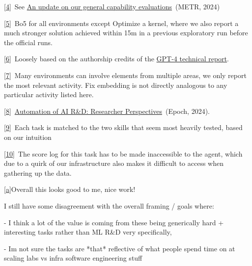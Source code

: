 \documentclass[
]{article}
\begin{document}
\label{ftnt4}\hyperref[ftnt_ref4]{{[}4{]}}{~See
}{\href{https://www.google.com/url?q=https://metr.org/blog/2024-08-06-update-on-evaluations/&sa=D&source=editors&ust=1727392285372972&usg=AOvVaw2_lcy3Rs5XzFgbeexWmZw4}{An
update on our general capability evaluations}}{~(METR, 2024)}

\label{ftnt5}\hyperref[ftnt_ref5]{{[}5{]}}{~Bo5 for all
environments except Optimize a kernel, where we also report a much
stronger solution achieved within 15m in a previous exploratory run
before the official runs. }

\label{ftnt6}\hyperref[ftnt_ref6]{{[}6{]}}{~Loosely based
on the authorship credits of the
}{\href{https://www.google.com/url?q=https://arxiv.org/pdf/2303.08774&sa=D&source=editors&ust=1727392285370539&usg=AOvVaw2hqvAcc6UrgD7zUjy1i2_m}{GPT-4
technical report}}{.}

\label{ftnt7}\hyperref[ftnt_ref7]{{[}7{]}}{~Many
environments can involve elements from multiple areas, we only report
the most relevant activity. Fix embedding is not directly analogous to
any particular activity listed here. }

\label{ftnt8}\hyperref[ftnt_ref8]{{[}8{]}}{~}{\href{https://www.google.com/url?q=https://epochai.org/blog/interviewing-ai-researchers-on-automation-of-ai-rnd&sa=D&source=editors&ust=1727392285370133&usg=AOvVaw2xjnvkd2-WZiOXprlR_JEF}{Automation
of AI R\&D: Researcher Perspectives}}{~(Epoch, 2024).}

\label{ftnt9}\hyperref[ftnt_ref9]{{[}9{]}}{~Each task is
matched to the two skills that seem most heavily tested, based on our
intuition}

\label{ftnt10}\hyperref[ftnt_ref10]{{[}10{]}}{~The score
log for this task has to be made inaccessible to the agent, which due to
a quirk of our infrastructure also makes it difficult to access when
gathering up the data. }

\label{cmnt1}\hyperref[cmnt_ref1]{{[}a{]}}{Overall this
looks good to me, nice work!}

{}

{I still have some disagreement with the overall framing / goals where:}

{- I think a lot of the value is coming from these being generically
hard + interesting tasks rather than ML R\&D very specifically, }

{- I\textquotesingle m not sure the tasks are *that* reflective of what
people spend time on at scaling labs vs infra software engineering
stuff}
\end{document}
